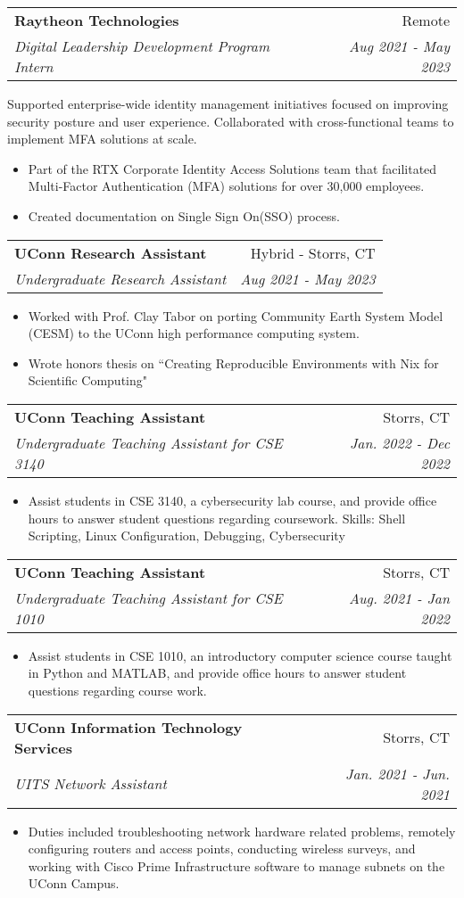 \documentclass[a4paper,11pt]{article}
\makeatletter
\newcommand{\resumeItemCustom}[2]{
  \item\small{
    \textbf{#1}{ #2 \vspace{-2pt}}
  }
}
\newcommand{\resumeSubheading}[4]{
  \vspace{-1pt}\item
    \begin{tabular*}{0.97\textwidth}{l@{\extracolsep{\fill}}r}
      \textbf{#1} & #2 \\
      \textit{#3} & \textit{#4} \\
    \end{tabular*}\vspace{-5pt}
}
\newcommand{\resumeItemListStart}{\begin{itemize}}
\newcommand{\resumeItemListEnd}{\end{itemize}\vspace{-5pt}}
\makeatother
\begin{document}
\vspace{2pt}
    \resumeSubheading{Raytheon Technologies}{Remote}
    {Digital Leadership Development Program Intern}{Aug 2021 - May 2023}
    
    Supported enterprise-wide identity management initiatives focused on improving security posture and user experience. Collaborated with cross-functional teams to implement MFA solutions at scale.
    \vspace{-3pt}
    \resumeItemListStart
    \resumeItemCustom{}{Part of the RTX Corporate Identity Access Solutions team that facilitated Multi-Factor Authentication (MFA) solutions for over 30,000 employees.}
    \resumeItemCustom{}{Created documentation on Single Sign On(SSO) process.}
    \resumeItemListEnd
    
\vspace{2pt}
    \resumeSubheading{UConn Research Assistant}{Hybrid - Storrs, CT}
    {Undergraduate Research Assistant}{Aug 2021 - May 2023}
    \resumeItemListStart
    \resumeItemCustom{}{Worked with Prof. Clay Tabor on porting Community Earth System Model (CESM) to the UConn high performance computing system.}
    \resumeItemCustom{}{Wrote honors thesis on ``Creating Reproducible Environments with Nix for Scientific Computing"}
    \resumeItemListEnd
    
\vspace{6pt}
    \resumeSubheading{UConn Teaching Assistant}{Storrs, CT}
    {Undergraduate Teaching Assistant for CSE 3140}{Jan. 2022 - Dec 2022}
    \resumeItemListStart
    \resumeItemCustom{}{Assist students in CSE 3140, a cybersecurity lab course, and provide office hours to answer student questions regarding coursework. Skills: Shell Scripting, Linux Configuration, Debugging, Cybersecurity}
    \resumeItemListEnd
    
\vspace{2pt}
    \resumeSubheading{UConn Teaching Assistant}{Storrs, CT}
    {Undergraduate Teaching Assistant for CSE 1010}{Aug. 2021 - Jan 2022}
    \resumeItemListStart
    \resumeItemCustom{}{Assist students in CSE 1010, an introductory computer science course taught in Python and MATLAB, and provide office hours to answer student questions regarding course work.}
    \resumeItemListEnd
    
\vspace{2pt}
    \resumeSubheading
		{UConn Information Technology Services}{Storrs, CT}
		{UITS Network Assistant}{ Jan. 2021 - Jun. 2021}
		\resumeItemListStart
        \resumeItemCustom{}{Duties included troubleshooting network hardware related problems, remotely configuring routers and access points, conducting wireless surveys, and working with Cisco Prime Infrastructure software to manage subnets on the UConn Campus.}
		\resumeItemListEnd
\end{document}
